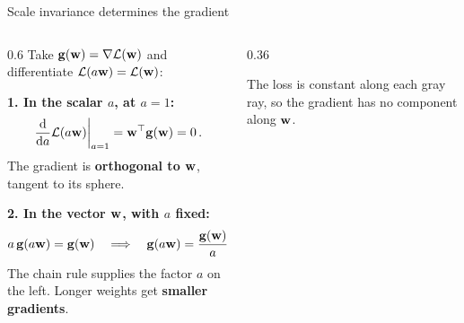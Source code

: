 \documentclass[11pt,aspectratio=169]{beamer}
\begin{document}
\begin{frame}{Scale invariance determines the gradient}

    \begin{columns}[c,onlytextwidth]
        \begin{column}{0.6\textwidth}%
            \setlength{\parskip}{5pt}%
            \RaggedRight\setlength{\parindent}{0pt}%
            \small
            Take $\boldsymbol{\mathbf{g}}(\boldsymbol{\mathbf{w}})=\nabla\mathcal{L}(\boldsymbol{\mathbf{w}})$ and differentiate $\mathcal{L}(a\boldsymbol{\mathbf{w}})=\mathcal{L}(\boldsymbol{\mathbf{w}})$:

            \textbf{1. In the scalar $a$, at $a=1$:}
            \[
                \left.\frac{\mathrm d}{\mathrm da}\mathcal{L}(a\boldsymbol{\mathbf{w}})\right|_{a=1}
                =\boldsymbol{\mathbf{w}}^{\top}\boldsymbol{\mathbf{g}}(\boldsymbol{\mathbf{w}})=0 \,.
            \]
            The gradient is \textbf{orthogonal to $\boldsymbol{\mathbf{w}}$}, tangent to its sphere.

            \textbf{2. In the vector $\boldsymbol{\mathbf{w}}$, with $a$ fixed:}
            \[
                a\,\boldsymbol{\mathbf{g}}(a\boldsymbol{\mathbf{w}})=\boldsymbol{\mathbf{g}}(\boldsymbol{\mathbf{w}})
                \quad\Longrightarrow\quad
                \boldsymbol{\mathbf{g}}(a\boldsymbol{\mathbf{w}})=\frac{\boldsymbol{\mathbf{g}}(\boldsymbol{\mathbf{w}})}{a} \,.
            \]
            The chain rule supplies the factor $a$ on the left.
            Longer weights get \textbf{smaller gradients}.
        \end{column}
        \begin{column}{0.36\textwidth}
            \centering

            {\scriptsize The loss is constant along each gray ray, so the
            gradient has no component along $\boldsymbol{\mathbf{w}}$.\par}
        \end{column}
    \end{columns}


\end{frame}
\end{document}
